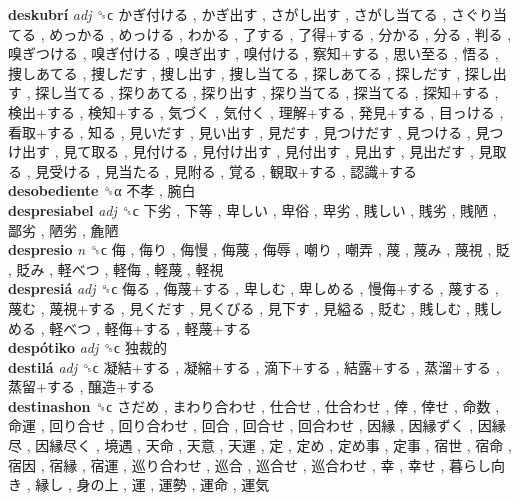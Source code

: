 \textbf{deskubrí} \emph{adj}  ␝ϲ   かぎ付ける ,  かぎ出す ,  さがし出す ,  さがし当てる ,  さぐり当てる ,  めっかる ,  めっける ,  わかる ,  了する ,  了得+する ,  分かる ,  分る ,  判る ,  嗅ぎつける ,  嗅ぎ付ける ,  嗅ぎ出す ,  嗅付ける ,  察知+する ,  思い至る ,  悟る ,  捜しあてる ,  捜しだす ,  捜し出す ,  捜し当てる ,  探しあてる ,  探しだす ,  探し出す ,  探し当てる ,  探りあてる ,  探り出す ,  探り当てる ,  探当てる ,  探知+する ,  検出+する ,  検知+する ,  気づく ,  気付く ,  理解+する ,  発見+する ,  目っける ,  看取+する ,  知る ,  見いだす ,  見い出す ,  見だす ,  見つけだす ,  見つける ,  見つけ出す ,  見て取る ,  見付ける ,  見付け出す ,  見付出す ,  見出す ,  見出だす ,  見取る ,  見受ける ,  見当たる ,  見附る ,  覚る ,  観取+する ,  認識+する   \\
\textbf{desobediente} ␝α   不孝 ,  腕白   \\
\textbf{despresiabel} \emph{adj}  ␝ϲ   下劣 ,  下等 ,  卑しい ,  卑俗 ,  卑劣 ,  賎しい ,  賎劣 ,  賎陋 ,  鄙劣 ,  陋劣 ,  麁陋   \\
\textbf{despresio} \emph{n}  ␝ϲ   侮 ,  侮り ,  侮慢 ,  侮蔑 ,  侮辱 ,  嘲り ,  嘲弄 ,  蔑 ,  蔑み ,  蔑視 ,  貶 ,  貶み ,  軽べつ ,  軽侮 ,  軽蔑 ,  軽視   \\
\textbf{despresiá} \emph{adj}  ␝ϲ   侮る ,  侮蔑+する ,  卑しむ ,  卑しめる ,  慢侮+する ,  蔑する ,  蔑む ,  蔑視+する ,  見くだす ,  見くびる ,  見下す ,  見縊る ,  貶む ,  賎しむ ,  賎しめる ,  軽べつ ,  軽侮+する ,  軽蔑+する   \\
\textbf{despótiko} \emph{adj}  ␝ϲ   独裁的   \\
\textbf{destilá} \emph{adj}  ␝ϲ   凝結+する ,  凝縮+する ,  滴下+する ,  結露+する ,  蒸溜+する ,  蒸留+する ,  醸造+する   \\
\textbf{destinashon} ␝ϲ   さだめ ,  まわり合わせ ,  仕合せ ,  仕合わせ ,  倖 ,  倖せ ,  命数 ,  命運 ,  回り合せ ,  回り合わせ ,  回合 ,  回合せ ,  回合わせ ,  因縁 ,  因縁ずく ,  因縁尽 ,  因縁尽く ,  境遇 ,  天命 ,  天意 ,  天運 ,  定 ,  定め ,  定め事 ,  定事 ,  宿世 ,  宿命 ,  宿因 ,  宿縁 ,  宿運 ,  巡り合わせ ,  巡合 ,  巡合せ ,  巡合わせ ,  幸 ,  幸せ ,  暮らし向き ,  縁し ,  身の上 ,  運 ,  運勢 ,  運命 ,  運気   \\
